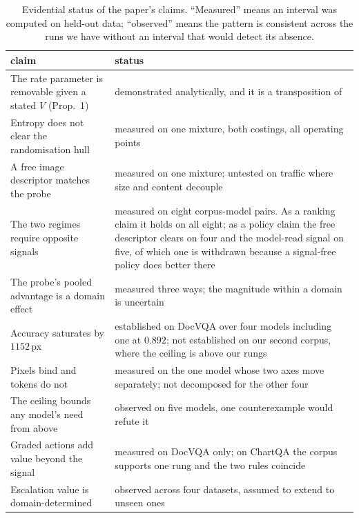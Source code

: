 \documentclass[10pt,twocolumn]{article}
\theoremstyle{plain}
\begin{document}
\begin{table}[t]
\centering\small
\setlength{\tabcolsep}{3pt}
\begin{tabular}{@{}p{4.05cm}p{3.5cm}@{}}
\toprule
claim & status \\
\midrule
The rate parameter is removable given a stated $V$ (Prop.~1) &
demonstrated analytically, and it is a transposition of~\cite{ucci} \\
\addlinespace
Entropy does not clear the randomisation hull &
measured on one mixture, both costings, all operating points \\
\addlinespace
A free image descriptor matches the probe &
measured on one mixture; untested on traffic where size and content decouple \\
\addlinespace
The two regimes require opposite signals &
measured on eight corpus-model pairs. As a ranking claim it holds on all eight;
as a policy claim the free descriptor clears on four and the model-read signal
on five, of which one is withdrawn because a signal-free policy does better
there \\
\addlinespace
The probe's pooled advantage is a domain effect &
measured three ways; the magnitude within a domain is uncertain \\
\addlinespace
Accuracy saturates by $1152$\,px &
established on DocVQA over four models including one at $0.892$; not established
on our second corpus, where the ceiling is above our rungs \\
\addlinespace
Pixels bind and tokens do not &
measured on the one model whose two axes move separately; not decomposed for the other four \\
\addlinespace
The ceiling bounds any model's need from above &
observed on five models, one counterexample would refute it \\
\addlinespace
Graded actions add value beyond the signal &
measured on DocVQA only; on ChartQA the corpus supports one rung and the two
rules coincide \\
\addlinespace
Escalation value is domain-determined &
observed across four datasets, assumed to extend to unseen ones \\
\bottomrule
\end{tabular}
\caption{Evidential status of the paper's claims. ``Measured'' means an
interval was computed on held-out data; ``observed'' means the pattern is
consistent across the runs we have without an interval that would detect its
absence.}
\label{tab:status}
\end{table}
\end{document}
